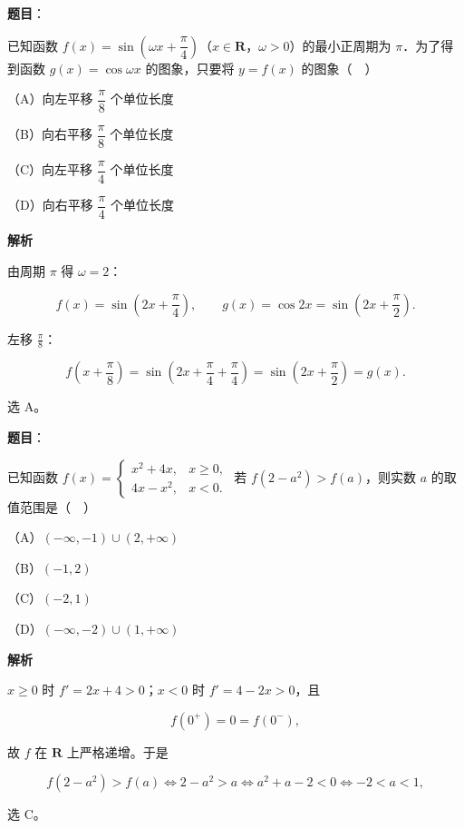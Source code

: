 \begin{answer}

\textbf{题目}：

已知函数 $f(x)=\sin\left(\omega x+\dfrac{\pi}{4}\right)$（$x\in\mathbf R$，$\omega>0$）的最小正周期为 $\pi$．为了得到函数 $g(x)=\cos\omega x$ 的图象，只要将 $y=f(x)$ 的图象（　）

（A）向左平移 $\dfrac{\pi}{8}$ 个单位长度

（B）向右平移 $\dfrac{\pi}{8}$ 个单位长度

（C）向左平移 $\dfrac{\pi}{4}$ 个单位长度

（D）向右平移 $\dfrac{\pi}{4}$ 个单位长度

\textbf{解析}

由周期 $\pi$ 得 $\omega=2$：

\nopagebreak[4]
\[f(x)=\sin\left(2x+\frac\pi4\right),\qquad
g(x)=\cos2x=\sin\left(2x+\frac\pi2\right).\]

左移 $\frac\pi8$：

\nopagebreak[4]
\[f\left(x+\frac\pi8\right)
=\sin\left(2x+\frac\pi4+\frac\pi4\right)
=\sin\left(2x+\frac\pi2\right)=g(x).\]

选 A。


\end{answer}
\begin{answer}

\textbf{题目}：

已知函数 $f(x)=\begin{cases}x^2+4x,&x\geqslant0,\\ 4x-x^2,&x<0.\end{cases}$ 若 $f(2-a^2)>f(a)$，则实数 $a$ 的取值范围是（　）

（A）$(-\infty,-1)\cup(2,+\infty)$

（B）$(-1,2)$

（C）$(-2,1)$

（D）$(-\infty,-2)\cup(1,+\infty)$

\textbf{解析}

$x\geqslant0$ 时 $f'=2x+4>0$；$x<0$ 时 $f'=4-2x>0$，且

\nopagebreak[4]
\[f(0^+)=0=f(0^-),\]

故 $f$ 在 $\mathbf R$ 上严格递增。于是

\nopagebreak[4]
\[f(2-a^2)>f(a)\iff 2-a^2>a
\iff a^2+a-2<0
\iff -2<a<1,\]

选 C。


\end{answer}
